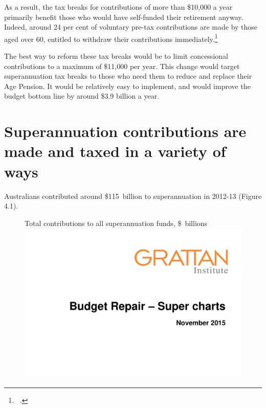 \documentclass{grattanAlpha}
\begin{document}
As a result, the tax breaks for contributions of more than \$10,000 a year primarily benefit those who would have self-funded their retirement anyway. Indeed, around 24 per cent of voluntary pre-tax contributions are made by those aged over 60, entitled to withdraw their contributions immediately.\footnote{\gao\ \textcite{ATO2015SampleFile1213}.\DEVIATION{}} 

The best way to reform these tax breaks would be to limit concessional contributions to a maximum of \$11,000 per year. This change would target superannuation tax breaks to those who need them to reduce and replace their Age Pension. It would be relatively easy to implement, and would improve the budget bottom line by around \$3.9 billion a year.

\section{Superannuation contributions are made and taxed in a variety of ways}
Australians contributed around \$115~billion to superannuation in 2012-13 (Figure 4.1). 
\begin{figure}
%
{Total contributions to all superannuation funds, \$\ billions}\label{fig:SUPER-4-1}
\includegraphics[width=\columnwidth,page=19]{super-atlas/PPTX.pdf}
\end{figure}
\end{document}
